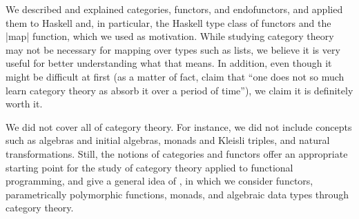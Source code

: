 \documentclass[11pt,letterpaper]{article}
\theoremstyle{definition}
\begin{document}
We described and explained categories, functors, and endofunctors, and
applied them to Haskell and, in particular, the Haskell type class of
functors and the |map| function, which we used as motivation. While
studying category theory may not be necessary for mapping over types
such as lists, we believe it is very useful for better understanding
what that means. In addition, even though it might be difficult at
first (as a matter of fact, \textcite[25]{bird-demoor-1997} claim that
``one does not so much learn category theory as absorb it over a
period of time''), we claim it is definitely worth it.

We did not cover all of category theory. For instance, we did not
include concepts such as algebras and initial algebras, monads and
Kleisli triples, and natural transformations. Still, the notions of
categories and functors offer an appropriate starting point for the
study of category theory applied to functional programming, and give a
general idea of \parencite{villaisaza-2014}, in which we consider
functors, parametrically polymorphic functions, monads, and algebraic
data types through category theory.


\printbibliography

\end{document}
